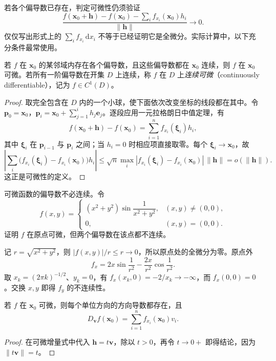 若各个偏导数已存在，判定可微性仍须验证
\[
    \frac{f(\boldsymbol x_0+\boldsymbol h)-f(\boldsymbol x_0)
       -\sum_i f_{x_i}(\boldsymbol x_0)h_i}{\|\boldsymbol h\|}\longrightarrow0.
\]
仅仅写出形式上的 $\sum_i f_{x_i}\,\mathrm dx_i$ 不等于已经证明它是全微分。实际计算中，以下充分条件最常使用。

\begin{theorem}
\label{thm:continuous-partials-imply-differentiability-ch14}
若 $f$ 在 $\boldsymbol x_0$ 的某邻域内存在各个偏导数，且这些偏导数都在 $\boldsymbol x_0$ 连续，则 $f$ 在 $\boldsymbol x_0$ 可微。若所有一阶偏导数在开集 $D$ 上连续，称 $f$ 在 $D$ 上\emph{连续可微}（continuously differentiable），记为 $f\in C^1(D)$。
\end{theorem}
\begin{proof}
取完全包含在 $D$ 内的一个小球，使下面依次改变坐标的线段都在其中。令
$\boldsymbol p_0=\boldsymbol x_0$，$\boldsymbol p_i=\boldsymbol x_0+\sum_{j=1}^i h_j\boldsymbol e_j$。逐段应用一元拉格朗日中值定理，有
\[
    f(\boldsymbol x_0+\boldsymbol h)-f(\boldsymbol x_0)
    =\sum_{i=1}^n f_{x_i}(\boldsymbol\xi_i)h_i,
\]
其中 $\boldsymbol\xi_i$ 在 $\boldsymbol p_{i-1}$ 与 $\boldsymbol p_i$ 之间；当 $h_i=0$ 时相应项直接取零。每个 $\boldsymbol\xi_i\to\boldsymbol x_0$，故
\[
    \left|\sum_i\bigl(f_{x_i}(\boldsymbol\xi_i)-f_{x_i}(\boldsymbol x_0)\bigr)h_i\right|
    \leq\sqrt n\max_i|f_{x_i}(\boldsymbol\xi_i)-f_{x_i}(\boldsymbol x_0)|\,
       \|\boldsymbol h\|
    =o(\|\boldsymbol h\|).
\]
这正是可微性的定义。
\end{proof}

\begin{example}
\label{ex:differentiable-discontinuous-partials-ch14}
可微函数的偏导数不必连续。令
\[
    f(x,y)=
    \begin{cases}
        (x^2+y^2)\sin\dfrac1{x^2+y^2},&(x,y)\ne(0,0),\\
        0,&(x,y)=(0,0).
    \end{cases}
\]
证明 $f$ 在原点可微，但两个偏导数在该点都不连续。
\end{example}
\begin{solve}
记 $r=\sqrt{x^2+y^2}$，则 $|f(x,y)|/r\leq r\to0$，所以原点处的全微分为零。原点外
\[
    f_x=2x\sin\frac1{r^2}-\frac{2x}{r^2}\cos\frac1{r^2}.
\]
取 $x_k=(2\pi k)^{-1/2}$、$y_k=0$，有 $f_x(x_k,0)=-2/x_k\to-\infty$，而 $f_x(0,0)=0$。交换 $x,y$ 即得 $f_y$ 的不连续性。
\end{solve}

\begin{proposition}
\label{prop:directional-derivative-of-differentiable-function-ch14}
若 $f$ 在 $\boldsymbol x_0$ 可微，则每个单位方向的方向导数都存在，且
\begin{equation}
\label{eq:directional-derivative-formula-ch14}
    D_{\boldsymbol v}f(\boldsymbol x_0)
    =\sum_{i=1}^n f_{x_i}(\boldsymbol x_0)v_i.
\end{equation}
\end{proposition}
\begin{proof}
在可微增量式中代入 $\boldsymbol h=t\boldsymbol v$，除以 $t>0$，再令 $t\to0+$ 即得结论，因为 $\|t\boldsymbol v\|=t$。
\end{proof}

